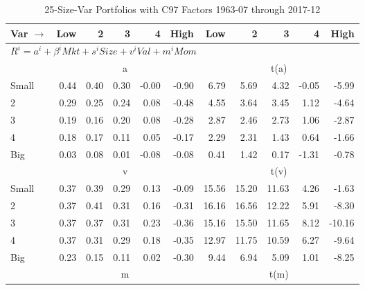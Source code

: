 
\begin{table}[!ht]
\footnotesize
\centering
\caption{25-Size-Var Portfolios with C97 Factors 1963-07 through 2017-12}
\begin{tabular}{lrrrrrrrrrr}
  \toprule
    Var $\rightarrow$ & Low & 2 & 3 & 4 & High & Low & 2 & 3 & 4 & High \\ 
  \midrule
  \multicolumn{11}{l}{$R^i=a^i+\beta^iMkt+s^iSize+v^iVal+m^iMom$} \\

  
    
      & \multicolumn{5}{c}{a} & \multicolumn{5}{c}{t(a)}
    
    \\
      \cmidrule(r){2-6} \cmidrule(r){7-11}

    Small   & 0.44  & 0.40  & 0.30  & -0.00  & -0.90  & 6.79  & 5.69  & 4.32  & -0.05  & -5.99  \\
         2  & 0.29  & 0.25  & 0.24  & 0.08  & -0.48  & 4.55  & 3.64  & 3.45  & 1.12  & -4.64  \\
         3  & 0.19  & 0.16  & 0.20  & 0.08  & -0.28  & 2.87  & 2.46  & 2.73  & 1.06  & -2.87  \\
         4  & 0.18  & 0.17  & 0.11  & 0.05  & -0.17  & 2.29  & 2.31  & 1.43  & 0.64  & -1.66  \\
    Big     & 0.03  & 0.08  & 0.01  & -0.08  & -0.08  & 0.41  & 1.42  & 0.17  & -1.31  & -0.78  \\

  
    
      & \multicolumn{5}{c}{v} & \multicolumn{5}{c}{t(v)}
    
    \\
      \cmidrule(r){2-6} \cmidrule(r){7-11}

    Small   & 0.37  & 0.39  & 0.29  & 0.13  & -0.09  & 15.56  & 15.20  & 11.63  & 4.26  & -1.63  \\
         2  & 0.37  & 0.41  & 0.31  & 0.16  & -0.31  & 16.16  & 16.56  & 12.22  & 5.91  & -8.30  \\
         3  & 0.37  & 0.37  & 0.31  & 0.23  & -0.36  & 15.16  & 15.50  & 11.65  & 8.12  & -10.16  \\
         4  & 0.37  & 0.31  & 0.29  & 0.18  & -0.35  & 12.97  & 11.75  & 10.59  & 6.27  & -9.64  \\
    Big     & 0.23  & 0.15  & 0.11  & 0.02  & -0.30  & 9.44  & 6.94  & 5.09  & 1.01  & -8.25  \\

  
    
      & \multicolumn{5}{c}{m} & \multicolumn{5}{c}{t(m)}
    

\end{tabular}
\end{table}

